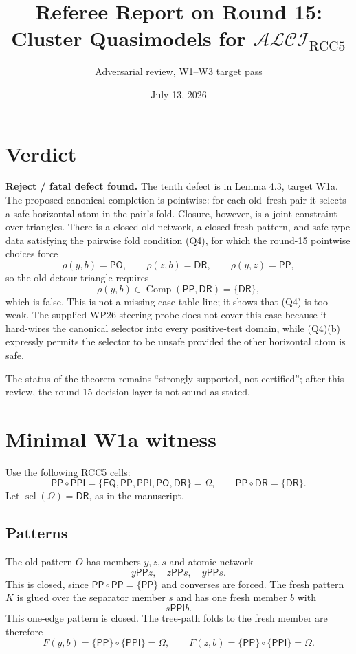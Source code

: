 \documentclass[11pt]{article}
\title{Referee Report on Round 15:\\
Cluster Quasimodels for $\mathcal{ALCI}_{\mathrm{RCC5}}$}
\author{Adversarial review, W1--W3 target pass}
\date{July 13, 2026}
\newcommand{\EQ}{\mathsf{EQ}}
\newcommand{\PP}{\mathsf{PP}}
\newcommand{\PPI}{\mathsf{PPI}}
\newcommand{\PO}{\mathsf{PO}}
\newcommand{\DR}{\mathsf{DR}}
\newcommand{\Comp}{\operatorname{Comp}}
\newcommand{\sel}{\operatorname{sel}}
\newcommand{\U}{\Omega}
\newcommand{\sev}[1]{\textbf{#1}}
\begin{document}
\maketitle

\section*{Verdict}

\noindent\sev{Reject / fatal defect found.}  The tenth defect is in
Lemma 4.3, target W1a.  The proposed canonical completion is pointwise:
for each old--fresh pair it selects a safe horizontal atom in the pair's
fold.  Closure, however, is a joint constraint over triangles.  There is
a closed old network, a closed fresh pattern, and safe type data satisfying
the pairwise fold condition (Q4), for which the round-15 pointwise choices
force
\[
  \rho(y,b)=\PO,\qquad \rho(z,b)=\DR,\qquad \rho(y,z)=\PP,
\]
so the old-detour triangle requires
\[
  \rho(y,b)\in \Comp(\PP,\DR)=\{\DR\},
\]
which is false.  This is not a missing case-table line; it shows that
(Q4) is too weak.  The supplied WP26 steering probe does not cover this
case because it hard-wires the canonical selector into every positive-test
domain, while (Q4)(b) expressly permits the selector to be unsafe provided
the other horizontal atom is safe.

The status of the theorem remains ``strongly supported, not certified'';
after this review, the round-15 decision layer is not sound as stated.

\section{Minimal W1a witness}

Use the following RCC5 cells:
\[
  \PP\circ\PPI=\{\EQ,\PP,\PPI,\PO,\DR\}=\U,
  \qquad
  \PP\circ\DR=\{\DR\}.
\]
Let $\sel(\U)=\DR$, as in the manuscript.

\subsection{Patterns}

The old pattern $O$ has members $y,z,s$ and atomic network
\[
  y\PP z,\quad z\PP s,\quad y\PP s.
\]
This is closed, since $\PP\circ\PP=\{\PP\}$ and converses are forced.
The fresh pattern $K$ is glued over the separator member $s$ and has one
fresh member $b$ with
\[
  s\PPI b.
\]
This one-edge pattern is closed.  The tree-path folds to the fresh member
are therefore
\[
  F(y,b)=\{\PP\}\circ\{\PPI\}=\U,
  \qquad
  F(z,b)=\{\PP\}\circ\{\PPI\}=\U.
\]
\end{document}
